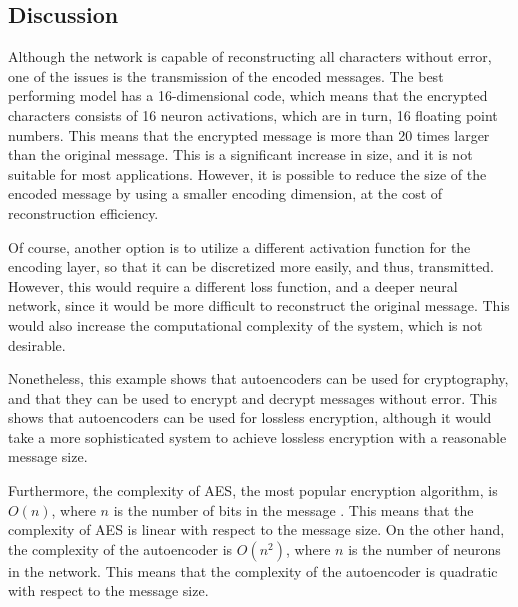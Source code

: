 \subsection{Discussion}

Although the network is capable of reconstructing all characters without error, one of the issues is the transmission of the encoded messages. The best performing model has a 16-dimensional code, which means that the encrypted characters consists of 16 neuron activations, which are in turn, 16 floating point numbers. This means that the encrypted message is more than 20 times larger than the original message. This is a significant increase in size, and it is not suitable for most applications. However, it is possible to reduce the size of the encoded message by using a smaller encoding dimension, at the cost of reconstruction efficiency.

Of course, another option is to utilize a different activation function for the encoding layer, so that it can be discretized more easily, and thus, transmitted. However, this would require a different loss function, and a deeper neural network, since it would be more difficult to reconstruct the original message. This would also increase the computational complexity of the system, which is not desirable.

Nonetheless, this example shows that autoencoders can be used for cryptography, and that they can be used to encrypt and decrypt messages without error. This shows that autoencoders can be used for lossless encryption, although it would take a more sophisticated system to achieve lossless encryption with a reasonable message size.

Furthermore, the complexity of AES, the most popular encryption algorithm, is $O(n)$, where $n$ is the number of bits in the message \cite{aes}. This means that the complexity of AES is linear with respect to the message size. On the other hand, the complexity of the autoencoder is $O(n^2)$, where $n$ is the number of neurons in the network. This means that the complexity of the autoencoder is quadratic with respect to the message size.
